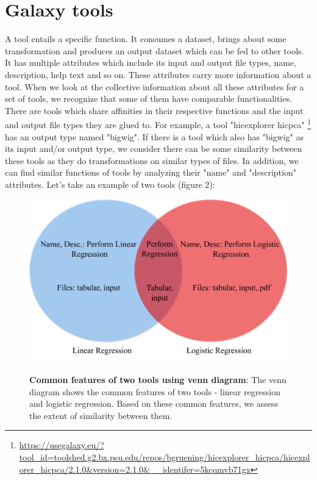 \section{Galaxy tools}
A tool entails a specific function. It consumes a dataset, brings about some transformation and produces an output dataset which can be fed to other tools. It has multiple attributes which include its input and output file types, name, description, help text and so on. These attributes carry more information about a tool. When we look at the collective information about all these attributes for a set of tools, we recognize that some of them have comparable functionalities. There are tools which share affinities in their respective functions and the input and output file types they are glued to. For example, a tool "hicexplorer hicpca" \footnote{\url{https://usegalaxy.eu/?tool_id=toolshed.g2.bx.psu.edu/repos/bgruening/hicexplorer_hicpca/hicexplorer_hicpca/2.1.0&version=2.1.0&__identifer=5kcqmvb71gx}} has an output type named "bigwig". If there is a tool which also has "bigwig" as its input and/or output type, we consider there can be some similarity between these tools as they do transformations on similar types of files. In addition, we can find similar functions of tools by analyzing their "name" and "description" attributes. Let's take an example of two tools (figure 2):
 
\begin{figure}[h]
\begin{centering}
    {\includegraphics[scale=0.5]{figures/Venn_common_tools_info.pdf}}
    \caption[Common features of two tools using venn diagram]{\textbf{Common features of two tools using venn diagram}: The venn diagram shows the common features of two tools - linear regression and logistic regression. Based on these common features, we assess the extent of similarity between them.}
\end{centering}
\end{figure}

